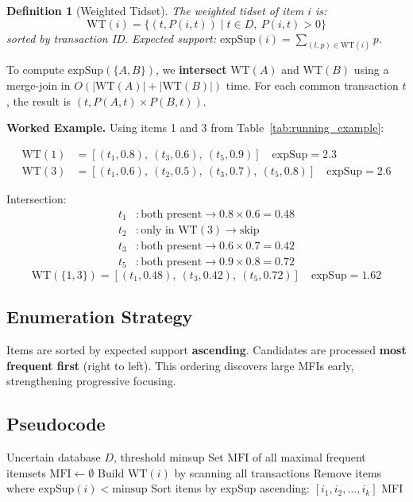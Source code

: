 \documentclass[12pt,a4paper]{report}
\newtheorem{definition}{Definition}[chapter]
\begin{document}
  \begin{definition}[Weighted Tidset]
The weighted tidset of item $i$ is:
\[ \text{WT}(i) = \{(t, P(i,t)) \mid t \in D,\ P(i,t) > 0\} \]
sorted by transaction ID. Expected support: $\text{expSup}(i) = \sum_{(t,p) \in \text{WT}(i)} p$.
  \end{definition}

  To compute $\text{expSup}(\{A, B\})$, we \textbf{intersect} $\text{WT}(A)$ and $\text{WT}(B)$ using a merge-join in $O(|\text{WT}(A)| + |\text{WT}(B)|)$ time. For each common transaction $t$, the result is $(t, P(A,t) \times P(B,t))$.

  \textbf{Worked Example.} Using items 1 and 3 from Table~\ref{tab:running_example}:

  \begin{align*}
    \text{WT}(1) &= [(t_1, 0.8),\ (t_3, 0.6),\ (t_5, 0.9)] \quad \text{expSup} = 2.3 \\
    \text{WT}(3) &= [(t_1, 0.6),\ (t_2, 0.5),\ (t_3, 0.7),\ (t_5, 0.8)] \quad \text{expSup} = 2.6
  \end{align*}

  Intersection:
  \begin{align*}
    t_1&: \text{both present} \rightarrow 0.8 \times 0.6 = 0.48 \\
    t_2&: \text{only in WT}(3) \rightarrow \text{skip} \\
    t_3&: \text{both present} \rightarrow 0.6 \times 0.7 = 0.42 \\
    t_5&: \text{both present} \rightarrow 0.9 \times 0.8 = 0.72
  \end{align*}
  \[ \text{WT}(\{1,3\}) = [(t_1, 0.48),\ (t_3, 0.42),\ (t_5, 0.72)] \quad \text{expSup} = 1.62 \]

  \subsection{Enumeration Strategy}

  Items are sorted by expected support \textbf{ascending}. Candidates are processed \textbf{most frequent first} (right to left). This ordering discovers large MFIs early, strengthening progressive focusing.

  \subsection{Pseudocode}

  \begin{algorithm}[H]
\caption{UGenMax}
\begin{algorithmic}[1]
  \Require Uncertain database $D$, threshold minsup
  \Ensure Set $\text{MFI}$ of all maximal frequent itemsets
  \State $\text{MFI} \gets \emptyset$
    \State Build $\text{WT}(i)$ by scanning all transactions
  \EndFor
  \State Remove items where $\text{expSup}(i) < \text{minsup}$
  \State Sort items by expSup ascending: $[i_1, i_2, \ldots, i_k]$
  \State {}
  \State \Return MFI
\end{algorithmic}
  \end{algorithm}
\end{document}

